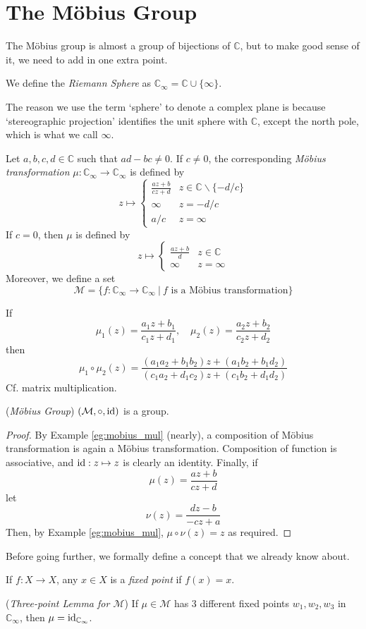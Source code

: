 \documentclass[10pt, a4paper, twoside]{report}
\begin{document}
\section{The Möbius Group}
The Möbius group is almost a group of bijections of \(\mathbb{C}\), but to make good sense of it, we need to add in one extra point.
\begin{definition}
    We define the \emph{Riemann Sphere} as \(\mathbb{C}_\infty=\mathbb{C}\cup\{\infty\}\).
\end{definition}
The reason we use the term `sphere' to denote a complex plane is because `stereographic projection' identifies the unit sphere with \(\mathbb{C}\), except the north pole, which is what we call \(\infty\).
\begin{definition}
    Let \(a,b,c,d\in\mathbb{C}\) such that \(ad-bc\neq 0\). If \(c\neq 0\), the corresponding \emph{Möbius transformation} \(\mu:\mathbb{C}_\infty\to\mathbb{C}_\infty\) is defined by 
    \[z\mapsto\begin{cases}
        \frac{az+b}{cz+d} & z\in\mathbb{C}\backslash\{-d/c\} \\
        \infty & z=-d/c \\
        a/c & z=\infty 
    \end{cases}\]
    If \(c=0\), then \(\mu\) is defined by 
    \[z\mapsto\begin{cases}
        \frac{az+b}{d} & z\in\mathbb{C} \\
        \infty & z=\infty
    \end{cases}\]
    Moreover, we define a set 
    \[\mathcal{M}=\{f:\mathbb{C}_\infty\to\mathbb{C}_\infty\:|\:f\text{  is a Möbius transformation}\}\]
\end{definition}
\begin{example}
    If 
    \[\mu_1(z)=\frac{a_1z+b_1}{c_1z+d_1},\quad\mu_2(z)=\frac{a_2z+b_2}{c_2z+d_2}\]
    then 
    \[\mu_1\circ\mu_2(z)=\frac{(a_1a_2+b_1b_2)z+(a_1b_2+b_1d_2)}{(c_1a_2+d_1c_2)z+(c_1b_2+d_1d_2)}\]
    Cf. matrix multiplication.
    \label{eg:mobius_mul}
\end{example}
\begin{theorem}
    (\emph{Möbius Group}) \((\mathcal{M},\circ,\operatorname{id})\) is a group.
\end{theorem}
\begin{proof}
    By Example \ref{eg:mobius_mul} (nearly), a composition of Möbius transformation is again a Möbius transformation. Composition of function is associative, and \(\operatorname{id}:z\mapsto z\) is clearly an identity. Finally, if 
    \[\mu(z)=\frac{az+b}{cz+d}\]
    let 
    \[\nu(z)=\frac{dz-b}{-cz+a}\]
    Then, by Example \ref{eg:mobius_mul}, \(\mu\circ\nu(z)=z\) as required.
\end{proof}
Before going further, we formally define a concept that we already know about. 
\begin{definition}
    If \(f:X\to X\), any \(x\in X\) is a \emph{fixed point} if \(f(x)=x\).
\end{definition}
\begin{lemma}
    (\emph{Three-point Lemma for \(\mathcal{M}\)}) If \(\mu\in\mathcal{M}\) has 3 different fixed points \(w_1,w_2,w_3\) in \(\mathbb{C}_\infty\), then \(\mu=\operatorname{id}_{\mathbb{C}_\infty}\).
\end{lemma}
\end{document}
